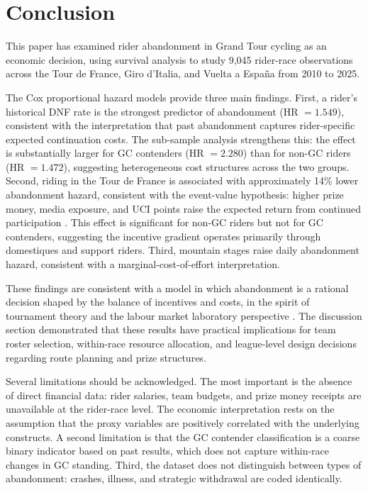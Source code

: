 \section{Conclusion}
\label{sec:conclusion}

This paper has examined rider abandonment in Grand Tour cycling as an economic decision, using survival analysis to study 9,045 rider-race observations across the Tour de France, Giro d'Italia, and Vuelta a Espa\~{n}a from 2010 to 2025.

The Cox proportional hazard models provide three main findings. First, a rider's historical DNF rate is the strongest predictor of abandonment (HR $= 1.549$), consistent with the interpretation that past abandonment captures rider-specific expected continuation costs. The sub-sample analysis strengthens this: the effect is substantially larger for GC contenders (HR $= 2.280$) than for non-GC riders (HR $= 1.472$), suggesting heterogeneous cost structures across the two groups. Second, riding in the Tour de France is associated with approximately 14\% lower abandonment hazard, consistent with the event-value hypothesis: higher prize money, media exposure, and UCI points raise the expected return from continued participation \parencite{blair2012sports}. This effect is significant for non-GC riders but not for GC contenders, suggesting the incentive gradient operates primarily through domestiques and support riders. Third, mountain stages raise daily abandonment hazard, consistent with a marginal-cost-of-effort interpretation.

These findings are consistent with a model in which abandonment is a rational decision shaped by the balance of incentives and costs, in the spirit of tournament theory \parencite{rosen1981superstars, lazear1981rank} and the labour market laboratory perspective \parencite{kahn2000labormarket}. The discussion section demonstrated that these results have practical implications for team roster selection, within-race resource allocation, and league-level design decisions regarding route planning and prize structures.

Several limitations should be acknowledged. The most important is the absence of direct financial data: rider salaries, team budgets, and prize money receipts are unavailable at the rider-race level. The economic interpretation rests on the assumption that the proxy variables are positively correlated with the underlying constructs. A second limitation is that the GC contender classification is a coarse binary indicator based on past results, which does not capture within-race changes in GC standing. Third, the dataset does not distinguish between types of abandonment: crashes, illness, and strategic withdrawal are coded identically.

